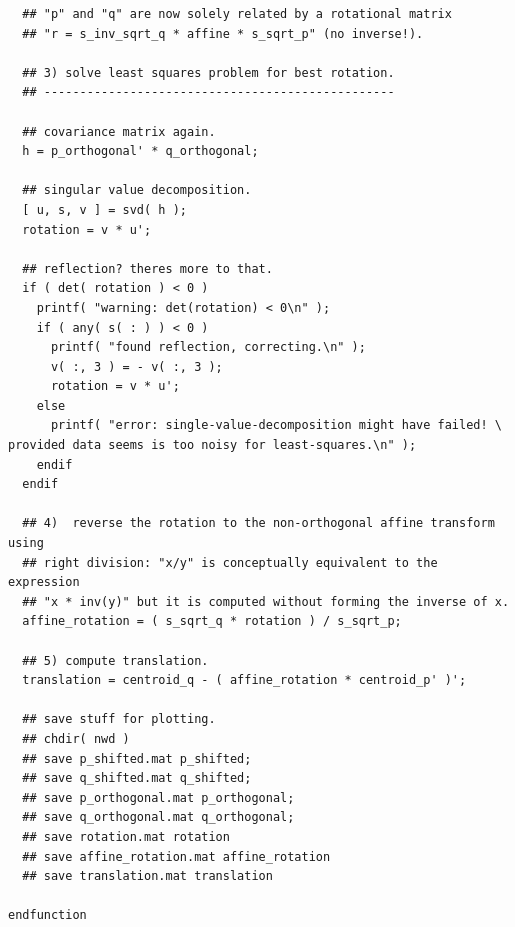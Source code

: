 \documentclass[11pt, a4paper, oneside, twocolumn]{report}
\newcommand{\n}{\textnormal}
\begin{document}
\begin{verbatim}
  ## "p" and "q" are now solely related by a rotational matrix
  ## "r = s_inv_sqrt_q * affine * s_sqrt_p" (no inverse!).

  ## 3) solve least squares problem for best rotation.
  ## -------------------------------------------------
  
  ## covariance matrix again.
  h = p_orthogonal' * q_orthogonal;

  ## singular value decomposition.
  [ u, s, v ] = svd( h );
  rotation = v * u';

  ## reflection? theres more to that.
  if ( det( rotation ) < 0 )
    printf( "warning: det(rotation) < 0\n" );
    if ( any( s( : ) ) < 0 )
      printf( "found reflection, correcting.\n" );
      v( :, 3 ) = - v( :, 3 );
      rotation = v * u';
    else
      printf( "error: single-value-decomposition might have failed! \
provided data seems is too noisy for least-squares.\n" );  
    endif
  endif

  ## 4)  reverse the rotation to the non-orthogonal affine transform using
  ## right division: "x/y" is conceptually equivalent to the expression
  ## "x * inv(y)" but it is computed without forming the inverse of x.
  affine_rotation = ( s_sqrt_q * rotation ) / s_sqrt_p;
  
  ## 5) compute translation.
  translation = centroid_q - ( affine_rotation * centroid_p' )';
  
  ## save stuff for plotting.
  ## chdir( nwd )
  ## save p_shifted.mat p_shifted;
  ## save q_shifted.mat q_shifted;
  ## save p_orthogonal.mat p_orthogonal;
  ## save q_orthogonal.mat q_orthogonal;
  ## save rotation.mat rotation
  ## save affine_rotation.mat affine_rotation
  ## save translation.mat translation
  
endfunction
\end{verbatim}
\end{document}
